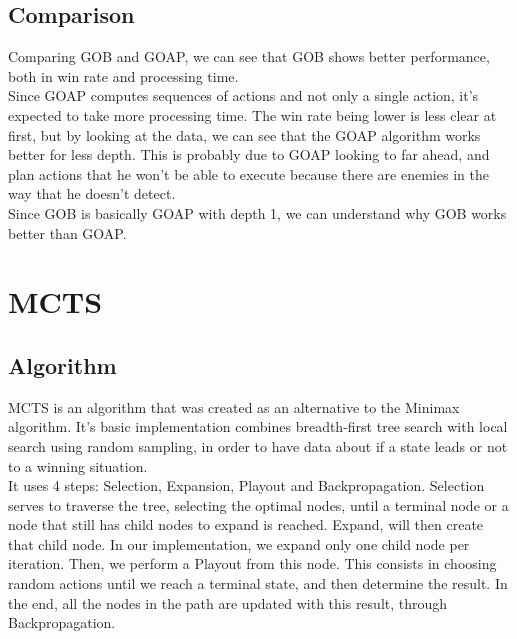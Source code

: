 \documentclass{article}
\begin{document}
  \subsection{Comparison}
  Comparing GOB and GOAP, we can see that GOB shows better performance, both in win rate and processing time. \\
  Since GOAP computes sequences of actions and not only a single action, it's expected to take more processing time. The win rate being lower is less clear at first, but
  by looking at the data, we can see that the GOAP algorithm works better for less depth. This is probably due to GOAP looking to far ahead, and plan actions 
  that he won't be able to execute because there are enemies in the way that he doesn't detect. \\
  Since GOB is basically GOAP with depth 1, we can understand why GOB works better than GOAP.
  
  \section{MCTS}
  \subsection{Algorithm}
  MCTS is an algorithm that was created as an alternative to the Minimax algorithm. It's basic implementation combines breadth-first tree search with local search using
  random sampling, in order to have data about if a state leads or not to a winning situation.\\
  It uses 4 steps: Selection, Expansion, Playout and Backpropagation. Selection serves to traverse the tree, selecting the optimal nodes, until a terminal node or a node that 
  still has child nodes to expand is reached. Expand, will then create that child node. In our implementation, we expand only one child node per iteration. Then, we perform 
  a Playout from this node. This consists in choosing random actions until we reach a terminal state, and then determine the result.
  In the end, all the nodes in the path are updated with this result, through Backpropagation.
  
\end{document}
